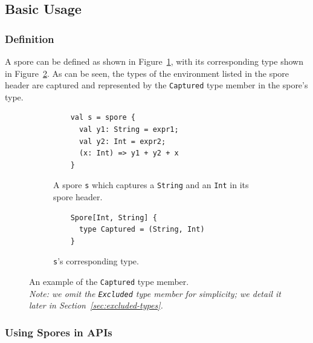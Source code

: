 \documentclass{llncs}
\begin{document}
\vspace{2mm}
\subsection{Basic Usage}
\label{sec:basic-usage}
\vspace{1mm}


\subsubsection{Definition}

A spore can be defined as shown in Figure~\ref{fig:captured-spore}, with its
corresponding type shown in Figure~\ref{fig:captured-type}. As can be seen,
the types of the environment listed in the spore header are captured and
represented by the \verb|Captured| type member in the spore's type.

\begin{figure}[t!]
\begin{subfigure}{.5\textwidth}
  \centering
  \begin{lstlisting}
    val s = spore {
      val y1: String = expr1;
      val y2: Int = expr2;
      (x: Int) => y1 + y2 + x
    }
  \end{lstlisting}
  \caption{A spore \texttt{s} which captures a \texttt{String} and an \texttt{Int} in its spore header.}
  \label{fig:captured-spore}
\end{subfigure}%
\begin{subfigure}{.5\textwidth}
  \centering
  \begin{lstlisting}
    Spore[Int, String] {
      type Captured = (String, Int)
    }
  \end{lstlisting}
  \caption{\texttt{s}'s corresponding type.}
  \label{fig:captured-type}
\end{subfigure}%
\vspace{1mm}
\caption{An example of the \texttt{Captured} type member. \\\textit{Note: we omit the
\texttt{Excluded} type member for simplicity; we detail it later in Section~\ref{sec:excluded-types}.}}
\label{fig:captured-ex}
\end{figure}

\subsubsection{Using Spores in APIs}
\end{document}
